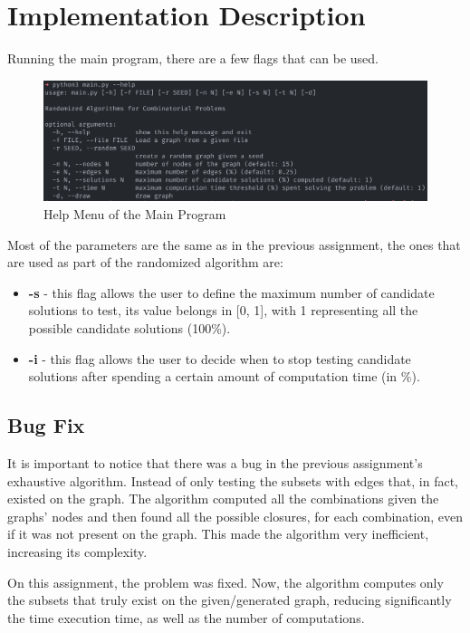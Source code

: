 \documentclass[...]{revdetua}
\begin{document}
\section{Implementation Description}

Running the main program, there are a few flags that
can be used.

\begin{figure}[!htb]
    \centering
    \includegraphics[width=1\columnwidth]{./figures/program_help}
    \caption{Help Menu of the Main Program}
    \label{fig: Help Menu}
\end{figure}

Most of the parameters are the same as in the previous assignment, the ones that are used as part of the randomized algorithm are:
\begin{itemize}
    \item \textbf{-s} - this flag allows the user to define the maximum number of candidate solutions to test, its value belongs in [0, 1], with 1 representing all the possible candidate solutions (100\%).
    \item \textbf{-i} - this flag allows the user to decide  when  to  stop  testing candidate solutions after spending a certain amount of computation time (in \%).
\end{itemize}

\subsection{Bug Fix}

It is important to notice that there was a bug in the previous assignment's exhaustive algorithm. Instead of only testing the subsets with edges that, in fact, existed on the graph. The algorithm computed all the combinations given the graphs' nodes and then found all the possible closures, for each combination, even if it was not present on the graph. This made the algorithm very inefficient, increasing its complexity.

On this assignment, the problem was fixed. Now, the algorithm computes only the subsets that truly exist on the given/generated graph, reducing significantly the time execution time, as well as the number of computations.
\end{document}
